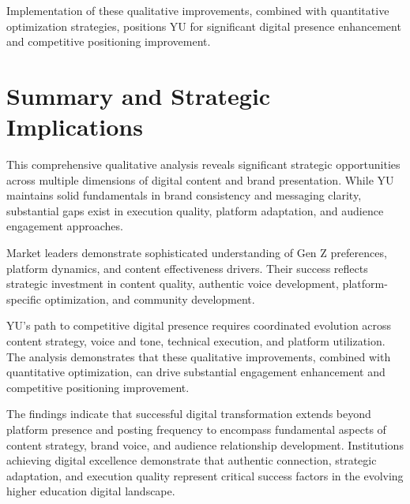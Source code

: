 \documentclass[12pt]{report}
\begin{document}
Implementation of these qualitative improvements, combined with quantitative optimization strategies, positions YU for significant digital presence enhancement and competitive positioning improvement.

\chapter{Summary and Strategic Implications}

This comprehensive qualitative analysis reveals significant strategic opportunities across multiple dimensions of digital content and brand presentation. While YU maintains solid fundamentals in brand consistency and messaging clarity, substantial gaps exist in execution quality, platform adaptation, and audience engagement approaches.

Market leaders demonstrate sophisticated understanding of Gen Z preferences, platform dynamics, and content effectiveness drivers. Their success reflects strategic investment in content quality, authentic voice development, platform-specific optimization, and community development.

YU's path to competitive digital presence requires coordinated evolution across content strategy, voice and tone, technical execution, and platform utilization. The analysis demonstrates that these qualitative improvements, combined with quantitative optimization, can drive substantial engagement enhancement and competitive positioning improvement.

The findings indicate that successful digital transformation extends beyond platform presence and posting frequency to encompass fundamental aspects of content strategy, brand voice, and audience relationship development. Institutions achieving digital excellence demonstrate that authentic connection, strategic adaptation, and execution quality represent critical success factors in the evolving higher education digital landscape.
\end{document}
